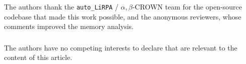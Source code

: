\documentclass[runningheads]{llncs}
\begin{document}
\begin{credits}
\subsubsection{\ackname}
The authors thank the \texttt{auto\_LiRPA} / $\alpha,\beta$-CROWN team for the
open-source codebase that made this work possible, and the anonymous reviewers,
whose comments improved the memory analysis.

\subsubsection{\discintname}
The authors have no competing interests to declare that are relevant to the
content of this article.
\end{credits}



\end{document}
